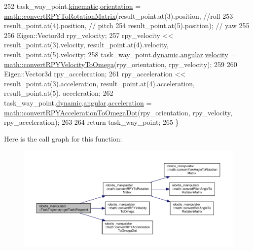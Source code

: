 \begin{DoxyCode}
252   task\_way\_point.\hyperlink{structrobotis__manipulator_1_1_pose_a7215a37d50e62643f1523d3fa40a36e9}{kinematic}.\hyperlink{structrobotis__manipulator_1_1_kinematic_pose_a0506da3cc344d21656fdd1befdd7fa27}{orientation} = 
      \hyperlink{namespacerobotis__manipulator_1_1math_a4bbc795e8c06dd0472ed25864f6ec886}{math::convertRPYToRotationMatrix}(result\_point.at(3).position,   \textcolor{comment}{//roll}
253                                                                        result\_point.at(4).position,   \textcolor{comment}{//
      pitch}
254                                                                        result\_point.at(5).position);   \textcolor{comment}{//
      yaw}
255 
256   Eigen::Vector3d rpy\_velocity;
257   rpy\_velocity << result\_point.at(3).velocity, result\_point.at(4).velocity, result\_point.at(5).velocity;
258   task\_way\_point.\hyperlink{structrobotis__manipulator_1_1_pose_a8accf10d21933e07ade2728fcccf4ae6}{dynamic}.\hyperlink{structrobotis__manipulator_1_1_dynamic_pose_a424459b0d1108f1e65594f5d193cbae6}{angular}.\hyperlink{structrobotis__manipulator_1_1_dynamicvector_a6bbccf8316887a8da3cd6aa065f3beac}{velocity} = 
      \hyperlink{namespacerobotis__manipulator_1_1math_a73d50f3962eeac18f464f879e6a0c8fc}{math::convertRPYVelocityToOmega}(rpy\_orientation, rpy\_velocity);
259 
260   Eigen::Vector3d rpy\_acceleration;
261   rpy\_acceleration << result\_point.at(3).acceleration, result\_point.at(4).acceleration, result\_point.at(5).
      acceleration;
262   task\_way\_point.\hyperlink{structrobotis__manipulator_1_1_pose_a8accf10d21933e07ade2728fcccf4ae6}{dynamic}.\hyperlink{structrobotis__manipulator_1_1_dynamic_pose_a424459b0d1108f1e65594f5d193cbae6}{angular}.\hyperlink{structrobotis__manipulator_1_1_dynamicvector_afc83eba2d67af4c23150a08824f0f01e}{acceleration} = 
      \hyperlink{namespacerobotis__manipulator_1_1math_a752d1631596538515894f09f210eb17b}{math::convertRPYAccelerationToOmegaDot}(rpy\_orientation, rpy\_velocity,
       rpy\_acceleration);
263 
264   \textcolor{keywordflow}{return} task\_way\_point;
265 \}
\end{DoxyCode}


Here is the call graph for this function\+:\nopagebreak
\begin{figure}[H]
\begin{center}
\leavevmode
\includegraphics[width=350pt]{classrobotis__manipulator_1_1_task_trajectory_a10718a16244458b0240ec357acfa09bd_cgraph}
\end{center}
\end{figure}





